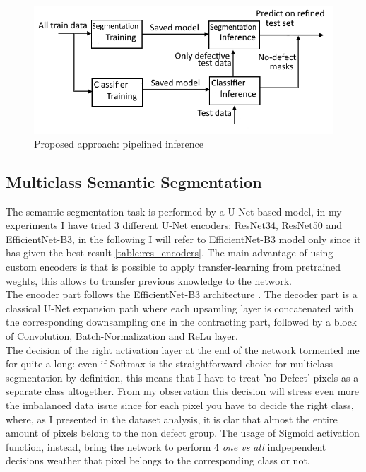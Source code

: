 \documentclass[10pt,twocolumn,letterpaper]{article}
\begin{document}
   \begin{figure}[h]
      \caption{Proposed approach: pipelined inference } \label{fig:secondApproach}
      \includegraphics[scale=0.48]{Img_SecondApproach}
   \end{figure}


   \subsection{Multiclass Semantic Segmentation}
   The semantic segmentation task is performed by a U-Net based model, in my experiments I have tried 3 different U-Net encoders: ResNet34, ResNet50 and EfficientNet-B3, in the following I will refer to EfficientNet-B3 model only since it has given the best result \ref{table:res_encoders}.
   The main advantage of using custom encoders is that is possible to apply transfer-learning from pretrained weghts, this allows to transfer previous knowledge to the network. \\
   The encoder part follows the EfficientNet-B3 architecture \cite{efficientnet}. The decoder part is a classical U-Net expansion path where each upsamling layer is concatenated with the corresponding downsampling one in the contracting part, followed by a block of Convolution, Batch-Normalization and ReLu layer. \\
   The decision of the right activation layer at the end of the network tormented me for quite a long: even if Softmax is the straightforward choice for multiclass segmentation by definition, this means that I have to treat 'no Defect' pixels as a separate class altogether. From my observation this decision will stress even more the imbalanced data issue since for each pixel you have to decide the right class, where, as I presented in the dataset analysis, it is clar that almost the entire amount of pixels belong to the non defect group. The usage of Sigmoid activation function, instead, bring the network to perform 4 \textit{one vs all} indpependent decisions weather that pixel belongs to the corresponding class or not. 
\end{document}
